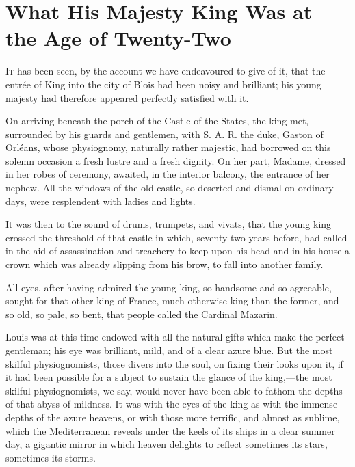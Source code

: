 \chapter[King \regnal{Louis XIV} at the Age of Twenty-Two]{What His Majesty King  Was at the Age of Twenty-Two}

	\lettrine{I}{t} has been seen, by the account we have endeavoured to give of it, that the entrée of King  into the city of Blois had been noisy and brilliant; his young majesty had therefore appeared perfectly satisfied with it.

\zz
On arriving beneath the porch of the Castle of the States, the king met, surrounded by his guards and gentlemen, with S. A. R. the duke, Gaston of Orléans, whose physiognomy, naturally rather majestic, had borrowed on this solemn occasion a fresh lustre and a fresh dignity. On her part, Madame, dressed in her robes of ceremony, awaited, in the interior balcony, the entrance of her nephew. All the windows of the old castle, so deserted and dismal on ordinary days, were resplendent with ladies and lights.

It was then to the sound of drums, trumpets, and vivats, that the young king crossed the threshold of that castle in which, seventy-two years before,  had called in the aid of assassination and treachery to keep upon his head and in his house a crown which was already slipping from his brow, to fall into another family.

All eyes, after having admired the young king, so handsome and so agreeable, sought for that other king of France, much otherwise king than the former, and so old, so pale, so bent, that people called the Cardinal Mazarin.

Louis was at this time endowed with all the natural gifts which make the perfect gentleman; his eye was brilliant, mild, and of a clear azure blue. But the most skilful physiognomists, those divers into the soul, on fixing their looks upon it, if it had been possible for a subject to sustain the glance of the king,—the most skilful physiognomists, we say, would never have been able to fathom the depths of that abyss of mildness. It was with the eyes of the king as with the immense depths of the azure heavens, or with those more terrific, and almost as sublime, which the Mediterranean reveals under the keels of its ships in a clear summer day, a gigantic mirror in which heaven delights to reflect sometimes its stars, sometimes its storms.

